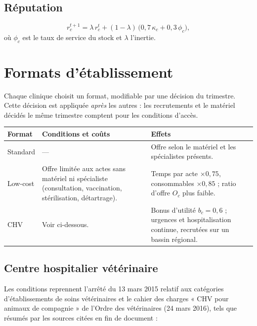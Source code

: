 \documentclass[11pt,a4paper]{article}
\begin{document}
\subsection{Réputation}

\[
  r_c^{t+1} = \lambda\, r_c^t + (1-\lambda)\,\bigl(0{,}7\,\kappa_c + 0{,}3\,\phi_c\bigr),
\]
où $\phi_c$ est le taux de service du stock et $\lambda$ l'inertie.

\section{Formats d'établissement}

Chaque clinique choisit un format, modifiable par une décision du
trimestre. Cette décision est appliquée \emph{après} les autres : les
recrutements et le matériel décidés le même trimestre comptent pour les
conditions d'accès.

\begin{center}
\begin{tabularx}{\textwidth}{@{}lXX@{}}
\toprule
Format & Conditions et coûts & Effets \\
\midrule
Standard & --- & Offre selon le matériel et les spécialistes présents. \\
Low-cost & Offre limitée aux actes sans matériel ni spécialiste
  (consultation, vaccination, stérilisation, détartrage). &
  Temps par acte $\times 0{,}75$, consommables $\times 0{,}85$ ;
  ratio d'offre $O_c$ plus faible. \\
CHV & Voir ci-dessous. &
  Bonus d'utilité $b_c = 0{,}6$ ; urgences et hospitalisation continue,
  recrutées sur un bassin régional. \\
\bottomrule
\end{tabularx}
\end{center}

\subsection{Centre hospitalier vétérinaire}

Les conditions reprennent l'arrêté du 13 mars 2015 relatif aux catégories
d'établissements de soins vétérinaires et le cahier des charges « CHV pour
animaux de compagnie » de l'Ordre des vétérinaires (24 mars 2016), tels que
résumés par les sources citées en fin de document :
\end{document}
